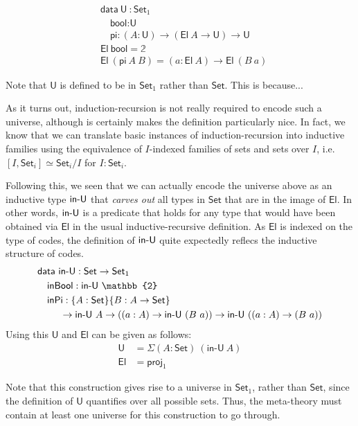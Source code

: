 \documentclass{easychair}
\newcommand{\ad}[1]{\AgdaFunction{#1}}
\newcommand{\Set}{\textsf{Set}}
\newcommand{\U}{\textsf{U}}
\newcommand{\El}{\textsf{El}}
\providecommand\mathbbm{\mathbb}
\begin{document}
\begin{align*}
  & \textsf{data}\ \U\ : \Set_1 \\
  & \quad \textsf{bool} : \U \\
  & \quad \textsf{pi} : (A : \U) \to (\El\ A \to \U) \to \U \\
  & \El\ \textsf{bool} = \mathbbm{2} \\
  & \El\ (\textsf{pi}\ A\ B) = (a : \El\ A) \to \El\ (B\ a)
\end{align*}

Note that $\U$ is defined to be in $\Set_1$ rather than $\Set$. This is
because... 

As it turns out, induction-recursion is not really required to encode such
a universe, although is certainly makes the definition particularly nice.
%
In fact, we know that we can translate basic instances of induction-recursion
into inductive families using the equivalence of $I$-indexed families of sets
and sets over $I$, i.e.\ $[I, \Set_i] \simeq \Set_i/I$ for $I : \Set_i$.

Following this, we seen that we can actually encode the universe above as an
inductive type $\ad{in-U}$ that \emph{carves out} all types in $\Set$ that are
in the image of $\El$. In other words, $\ad{in-U}$ is a predicate that holds for
any type that would have been obtained via $\El$ in the usual
inductive-recursive definition. As $\El$ is indexed on the type of codes, the
definition of $\ad{in-U}$ quite expectedly reflecs the inductive structure of
codes.
%
\begin{align*}
  & \textsf{data}\ \ad{in-U} : \Set \to \Set_1 \\
  & \quad \textsf{inBool} : \textsf{in-U}\ \mathbbm{2} \\
  & \quad \textsf{inPi}
  :  \{A : \Set\} \{B : A \to \Set\}\\
  & \ \qquad \to \ad{in-U}\ A
  \to ((a : A) \to \ad{in-U}\ (B\ a))
  \to \ad{in-U}\ ((a : A) \to (B\ a))
\end{align*}
Using this $\U$ and $\El$ can be given as follows:
\begin{align*}
  \U & = \Sigma (A : \Set)\ (\textsf{in-U}\ A) \\
  \El & = \textsf{proj}_1
\end{align*}

Note that this construction gives rise to a universe in $\Set_1$, rather than
$\Set$, since the definition of $\U$ quantifies over all possible sets. Thus,
the meta-theory must contain at least one universe for this construction to go
through.
\end{document}
